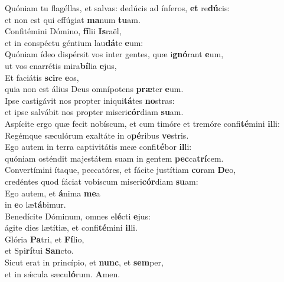\evenverse Quóniam tu flagéllas, et salvas: dedúcis ad ínferos, \textbf{et} re\textbf{dú}cis:~\*\\
\evenverse et non est qui effúgiat \textbf{ma}num \textbf{tu}am.\\
\oddverse Confitémini Dómino, \textbf{fí}lii \textbf{Is}raël,~\*\\
\oddverse et in conspéctu géntium lau\textbf{dá}te \textbf{e}um:\\
\evenverse Quóniam ídeo dispérsit vos inter gentes, quæ i\textbf{gnó}rant \textbf{e}um,~\*\\
\evenverse ut vos enarrétis mira\textbf{bí}lia \textbf{e}jus,\\
\oddverse Et faciátis \textbf{sci}re \textbf{e}os,~\*\\
\oddverse quia non est álius Deus omnípotens \textbf{præ}ter \textbf{e}um.\\
\evenverse Ipse castigávit nos propter iniqui\textbf{tá}tes \textbf{no}stras:~\*\\
\evenverse et ipse salvábit nos propter miseri\textbf{cór}diam \textbf{su}am.\\
\oddverse Aspícite ergo quæ fecit nobíscum, et cum timóre et tremóre confi\textbf{té}mini \textbf{il}li:~\*\\
\oddverse Regémque sæculórum exaltáte in o\textbf{pé}ribus \textbf{ve}stris.\\
\evenverse Ego autem in terra captivitátis meæ confi\textbf{té}bor \textbf{il}li:~\*\\
\evenverse quóniam osténdit majestátem suam in gentem \textbf{pec}ca\textbf{trí}cem.\\
\oddverse Convertímini ítaque, peccatóres, et fácite justítiam \textbf{co}ram \textbf{De}o,~\*\\
\oddverse credéntes quod fáciat vobíscum miseri\textbf{cór}diam \textbf{su}am:\\
\evenverse Ego autem, et \textbf{á}nima \textbf{me}a~\*\\
\evenverse in \textbf{e}o læ\textbf{tá}bimur.\\
\oddverse Benedícite Dóminum, omnes e\textbf{lé}cti \textbf{e}jus:~\*\\
\oddverse ágite dies lætítiæ, et confi\textbf{té}mini \textbf{il}li.\\
\evenverse Glória \textbf{Pa}tri, et \textbf{Fí}lio,~\*\\
\evenverse et Spi\textbf{rí}tui \textbf{San}cto.\\
\oddverse Sicut erat in princípio, et \textbf{nunc}, et \textbf{sem}per,~\*\\
\oddverse et in sǽcula sæcu\textbf{ló}rum. \textbf{A}men.\\
